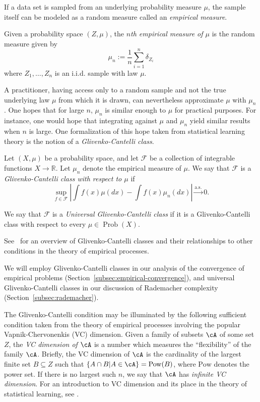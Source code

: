 \documentclass[twoside,11pt]{article}
\DeclareMathOperator{\prob}{Prob}
\newcommand{\set}[2]{\left\{ #1\middle| #2\right\}}
\newcommand{\pow}{\mathrm{Pow}}%
\begin{document}
If a data set is sampled from an underlying probability measure $\mu$, the sample itself can be modeled as a random measure called an \emph{empirical measure}.
\begin{definition}
    Given a probability space $(Z,\mu)$, the \emph{$n$th empirical measure of $\mu$} is the random measure given by
    \[\mu_n:= \frac{1}{n}\sum_{i=1}^n \delta_{Z_i}\]
    where $Z_1,\dots, Z_n$ is an i.i.d. sample with law $\mu$.
\end{definition}
A practitioner, having access only to a random sample and not the true underlying law $\mu$ from which it is drawn, can nevertheless approximate $\mu$ with $\mu_n$.
One hopes that for large $n$, $\mu_n$ is similar enough to $\mu$ for practical purposes. For instance, one would hope that integrating against $\mu$ and $\mu_n$ yield similar results when $n$ is large. One formalization of this hope taken from statistical learning theory is the notion of a \emph{Glivenko-Cantelli class}.
\begin{definition}
    Let $(X,\mu)$ be a probability space, and let $\mathcal F$ be a collection of integrable functions $X\to \mathbb R$. Let $\mu_n$ denote the empirical measure of $\mu$. We say that $\mathcal F$ is a \emph{Glivenko-Cantelli class with respect to $\mu$} if
    \[
    \sup_{f\in \mathcal F} \left| \int f(x) \mu(dx) - \int  f(x) \mu_n(dx) \right| \xrightarrow{\text{a.s.}} 0.
    \]

    We say that $\mathcal F$ is a \emph{Universal Glivenko-Cantelli class} if it is a Glivenko-Cantelli class with respect to every $\mu \in \prob(X)$.
\end{definition}
See~\citet{van_der_vaart_weak_1996} for an overview of Glivenko-Cantelli classes and their relationships to other conditions in the theory of empirical processes.

We will employ Glivenko-Cantelli classes in our analysis of the convergence of empirical problems (Section~\ref{subsec:empirical-convergence}), and universal Glivenko-Cantelli classes in our discussion of Rademacher complexity (Section~\ref{subsec:rademacher}).

The Glivenko-Cantelli condition may be illuminated by the following sufficient condition taken from the theory of empirical processes involving the popular Vapnik-Chervonenkis (VC) dimension. Given a family of subsets $\cA$ of some set $Z$, the \emph{VC dimension of $\cA$} is a number which measures the ``flexibility'' of the family $\cA$. Briefly, the VC dimension of $\cA$ is the cardinality of the largest finite set $B\subseteq Z$ such that $\set{A\cap B}{A\in \cA} = \pow(B)$, where $\pow$ denotes the power set. If there is no largest such $n$, we say that $\cA$ has \emph{infinite VC dimension}. For an introduction to VC dimension and its place in the theory of statistical learning, see \citet[Ch 12]{devroye_probabilistic_1996}.
\end{document}
